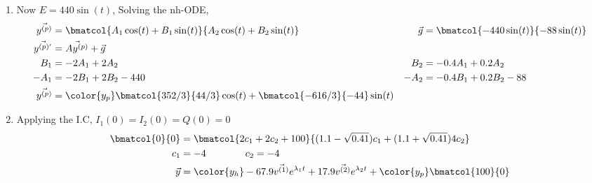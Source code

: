 \begin{enumerate}
    \item Now $ E = 440\sin(t) $,
          Solving the nh-ODE,
          \begin{align}
              \vec{y^{(p)}}               & = \bmatcol{A_1\cos(t) + B_1 \sin(t)}
              {A_2 \cos(t) + B_2 \sin(t)} &
              \vec{g}                     & = \bmatcol{-440\sin(t)}{-88\sin(t)}    \\
              \vec{y^{(p)'}}              & = \vec{Ay^{(p)}} + \vec{g}             \\
              B_1                         & = -2A_1 + 2A_2                       &
              B_2                         & =  -0.4A_1 + 0.2A_2                    \\
              -A_1                        & = -2B_1 + 2B_2 - 440                 &
              -A_2                        & =  -0.4B_1 + 0.2B_2 - 88               \\
              \vec{y^{(p)}}               & = \color{y_p}
              \bmatcol{352/3}{44/3} \cos(t) + \bmatcol{-616/3}{-44} \sin(t)
          \end{align}

    \item Applying the I.C, $ I_1(0) = I_2(0) = Q(0) = 0 $
          \begin{align}
              \bmatcol{0}{0} & = \bmatcol
              {2c_1 + 2c_2 + 100}
              {(1.1 - \sqrt{0.41})c_1 + (1.1 + \sqrt{0.41})4c_2} \\
              c_1            & = -4 \qquad\qquad c_2 = -4        \\
              \vec{y}        & = {\color{y_h}
              -67.9 \vec{v^{(1)}}e^{\lambda_1 t}
              + 17.9 \vec{v^{(2)}} e^{\lambda_2 t}}
              + {\color{y_p} \bmatcol{100}{0}}
          \end{align}


\end{enumerate}
